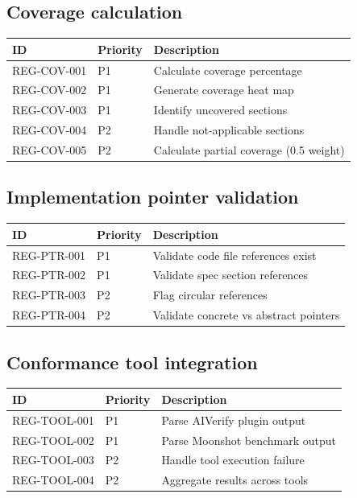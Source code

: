 \subsection{Coverage calculation}

\begin{tabularx}{\linewidth}{@{}l l X@{}}
\toprule
\textbf{ID} & \textbf{Priority} & \textbf{Description} \\ \midrule
REG-COV-001 & P1 & Calculate coverage percentage \\
REG-COV-002 & P1 & Generate coverage heat map \\
REG-COV-003 & P1 & Identify uncovered sections \\
REG-COV-004 & P2 & Handle not-applicable sections \\
REG-COV-005 & P2 & Calculate partial coverage (0.5 weight) \\
\bottomrule
\end{tabularx}

\subsection{Implementation pointer validation}

\begin{tabularx}{\linewidth}{@{}l l X@{}}
\toprule
\textbf{ID} & \textbf{Priority} & \textbf{Description} \\ \midrule
REG-PTR-001 & P1 & Validate code file references exist \\
REG-PTR-002 & P1 & Validate spec section references \\
REG-PTR-003 & P2 & Flag circular references \\
REG-PTR-004 & P2 & Validate concrete vs abstract pointers \\
\bottomrule
\end{tabularx}

\subsection{Conformance tool integration}

\begin{tabularx}{\linewidth}{@{}l l X@{}}
\toprule
\textbf{ID} & \textbf{Priority} & \textbf{Description} \\ \midrule
REG-TOOL-001 & P1 & Parse AIVerify plugin output \\
REG-TOOL-002 & P1 & Parse Moonshot benchmark output \\
REG-TOOL-003 & P2 & Handle tool execution failure \\
REG-TOOL-004 & P2 & Aggregate results across tools \\
\bottomrule
\end{tabularx}


